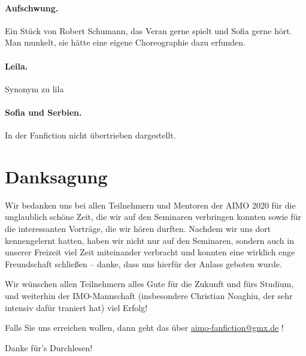 \documentclass[oneside]{memoir}
\begin{document}
\paragraph{Aufschwung.} Ein Stück von Robert Schumann, das Veran gerne spielt und Sofia gerne hört. Man munkelt, sie hätte eine eigene Choreographie dazu erfunden.

\paragraph{Leila.} Synonym zu lila

\paragraph{Sofia und Serbien.} In der Fanfiction nicht übertrieben dargestellt.





\newpage
\section*{Danksagung}

Wir bedanken uns bei allen Teilnehmern und Mentoren der AIMO 2020 für die unglaublich schöne Zeit, die wir auf den Seminaren verbringen konnten sowie für die interessanten Vorträge, die wir hören durften. Nachdem wir uns dort kennengelernt hatten, haben wir nicht nur auf den Seminaren, sondern auch in unserer Freizeit viel Zeit miteinander verbracht und konnten eine wirklich enge Freundschaft schließen -- danke, dass uns hierfür der Anlass geboten wurde.

\medskip
\noindent Wir wünschen allen Teilnehmern alles Gute für die Zukunft und fürs Studium, und weiterhin der IMO-Mannschaft (insbesondere Christian Noaghiu, der sehr intensiv dafür traniert hat) viel Erfolg!

\medskip
\noindent Falls Sie uns erreichen wollen, dann geht das über \url{aimo-fanfiction@gmx.de} !

\medskip
\noindent Danke für's Durchlesen!
\end{document}
